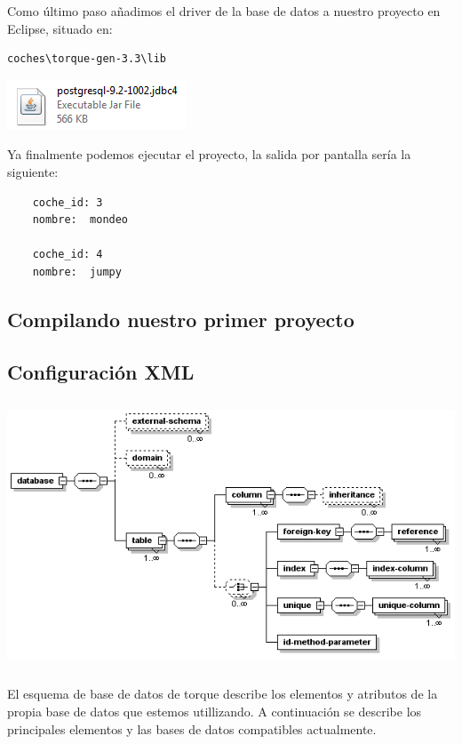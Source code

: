 \documentclass[12pt, oneside]{article}
\begin{document}
	
	
	Como último paso añadimos el driver de la base de datos a nuestro proyecto en Eclipse, situado en:
	
\begin{lstlisting}
coches\torque-gen-3.3\lib
\end{lstlisting}

	\begin{center}
		\includegraphics{img/postgresql-file.png}
	\end{center}

	Ya finalmente podemos ejecutar el proyecto, la salida por pantalla sería la siguiente: 
	
	\begin{lstlisting}
	coche_id: 3
	nombre:  mondeo

	coche_id: 4
	nombre:  jumpy
	\end{lstlisting}

\subsection{Compilando nuestro primer proyecto}
\subsection{Configuración XML}
	\begin{center}
		\includegraphics[height=8cm]{img/xml-config.png}
	\end{center}
	
	El esquema de base de datos de torque describe los elementos y atributos de la propia base de datos que estemos utillizando. A continuación se describe los principales elementos y las bases de datos compatibles actualmente.
\end{document}
